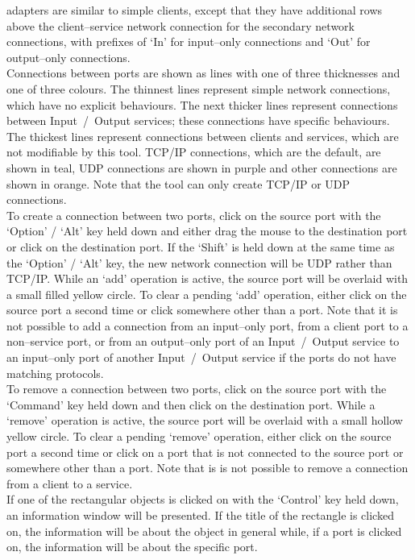 \mplusm{} adapters are similar to \mplusm{} simple clients, except that they have
additional rows above the client--service \yarp{} network connection for the secondary
\yarp{} network connections, with prefixes of `In' for input--only connections and `Out'
for output--only connections.\\

Connections between ports are shown as lines with one of three thicknesses and one of
three colours.
The thinnest lines represent simple \yarp{} network connections, which have no explicit
behaviours.
The next thicker lines represent connections between Input~/~Output services; these
connections have specific behaviours.
The thickest lines represent connections between clients and services, which are not
modifiable by this tool.
TCP/IP connections, which are the default, are shown in teal, UDP connections are shown in
purple and other connections are shown in orange.
Note that the tool can only create TCP/IP or UDP connections.\\

To create a connection between two ports, click on the source port with the `Option' /
`Alt' key held down and either drag the mouse to the destination port or click on the
destination port.
If the `Shift' is held down at the same time as the `Option' / `Alt' key, the new
network connection will be UDP rather than TCP/IP.
While an `add' operation is active, the source port will be overlaid with a small filled
yellow circle.
To clear a pending `add' operation, either click on the source port a second time or click
somewhere other than a port.
Note that it is not possible to add a connection from an input--only port, from a client
port to a non--service port, or from an output--only port of an Input~/~Output service to
an input--only port of another Input~/~Output service if the ports do not have matching
protocols.\\

To remove a connection between two ports, click on the source port with the `Command' key
held down and then click on the destination port.
While a `remove' operation is active, the source port will be overlaid with a small
hollow yellow circle.
To clear a pending `remove' operation, either click on the source port a second time or
click on a port that is not connected to the source port or somewhere other than a port.
Note that is is not possible to remove a connection from a client to a service.\\

If one of the rectangular objects is clicked on with the `Control' key held down, an
information window will be presented.
If the title of the rectangle is clicked on, the information will be about the
object in general while, if a port is clicked on, the information will be about the
specific port.\\


